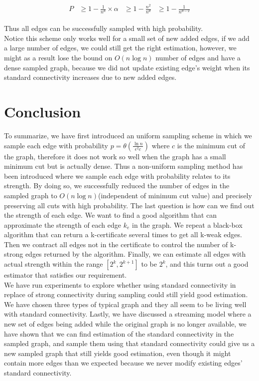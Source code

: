 \documentclass{article}
\begin{document}
\begin{align}
    \begin{aligned}
        P &\geq 1 - \frac{1}{n^d} \times \alpha
          &\geq 1 - \frac{n^2}{n^d}
          &\geq 1 - \frac{1}{n^{d-2}}
    \end{aligned}
\end{align}

Thus all edges can be successfully sampled with high probability.\\

Notice this scheme only works well for a small set of new added edges, if we add a large number of edges, we could still get the right estimation, however, we might as a result lose the bound on $O(n \log n)$ number of edges and have a dense sampled graph, because we did not update existing edge's weight when its standard connectivity increases due to new added edges.


\section{Conclusion}
To summarize, we have first introduced an uniform sampling scheme in which we sample each edge with probability $p = \theta (\frac{\ln{n}}{\epsilon^2c})$ where $c$ is the minimum cut of the graph, therefore it does not work so well when the graph has a small minimum cut but is actually dense. Thus a non-uniform sampling method has been introduced where we sample each edge with probability relates to its strength. By doing so, we successfully reduced the number of edges in the sampled graph to $O(n \log n)$(independent of minimum cut value) and precisely preserving all cuts with high probability. The last question is how can we find out the strength of each edge. We want to find a good algorithm that can approximate the strength of each edge $k_e$ in the graph. We repeat a black-box algorithm that can return a k-certificate several times to get all k-weak edges. Then we contract all edges not in the certificate to control the number of k-strong edges returned by the algorithm. Finally, we can estimate all edges with actual strength within the range $[2^k, 2^{k+1}]$ to be $2^k$, and this turns out a good estimator that satisfies our requirement. \\

We have run experiments to explore whether using standard connectivity in replace of strong connectivity during sampling could still yield good estimation. We have chosen three types of typical graph and they all seem to be living well with standard connectivity. Lastly, we have discussed a streaming model where a new set of edges being added while the original graph is no longer available, we have shown that we can find estimation of the standard connectivity in the sampled graph, and sample them using that standard connectivity could give us a new sampled graph that still yields good estimation, even though it might contain more edges than we expected because we never modify existing edges' standard connectivity.



\end{document}
